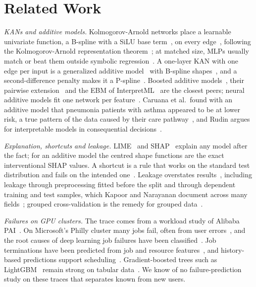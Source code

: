 \section{Related Work}
\label{sec:related}

\emph{KANs and additive models.} Kolmogorov-Arnold networks place a learnable univariate function, a B-spline with a SiLU base term~\cite{elfwing2018silu}, on every edge~\cite{liu2025kan}, following the Kolmogorov-Arnold representation theorem~\cite{kolmogorov1963representation}; at matched size, MLPs usually match or beat them outside symbolic regression~\cite{yu2024kanormlp}. A one-layer KAN with one edge per input is a generalized additive model~\cite{hastie1986gam} with B-spline shapes~\cite{deboor1978splines}, and a second-difference penalty makes it a P-spline~\cite{eilers1996psplines}. Boosted additive models~\cite{lou2012intelligible}, their pairwise extension~\cite{lou2013ga2m} and the EBM of InterpretML~\cite{nori2019interpretml} are the closest peers; neural additive models fit one network per feature~\cite{agarwal2021nam}. Caruana et al.\ found with an additive model that pneumonia patients with asthma appeared to be at lower risk, a true pattern of the data caused by their care pathway~\cite{caruana2015intelligible}, and Rudin argues for interpretable models in consequential decisions~\cite{rudin2019stop}.

\emph{Explanation, shortcuts and leakage.} LIME~\cite{ribeiro2016lime} and SHAP~\cite{lundberg2017shap} explain any model after the fact; for an additive model the centred shape functions are the exact interventional SHAP values. A shortcut is a rule that works on the standard test distribution and fails on the intended one~\cite{geirhos2020shortcut}. Leakage overstates results~\cite{kaufman2012leakage}, including leakage through preprocessing fitted before the split and through dependent training and test samples, which Kapoor and Narayanan document across many fields~\cite{kapoor2023leakage}; grouped cross-validation is the remedy for grouped data~\cite{roberts2017cv}.

\emph{Failures on GPU clusters.} The trace comes from a workload study of Alibaba PAI~\cite{weng2022mlaas}. On Microsoft's Philly cluster many jobs fail, often from user errors~\cite{jeon2019philly}, and the root causes of deep learning job failures have been classified~\cite{zhang2020dlfailures}. Job terminations have been predicted from job and resource features~\cite{elsayed2017failure}, and history-based predictions support scheduling~\cite{hu2021helios}. Gradient-boosted trees such as LightGBM~\cite{ke2017lightgbm} remain strong on tabular data~\cite{grinsztajn2022tree}. We know of no failure-prediction study on these traces that separates known from new users.

